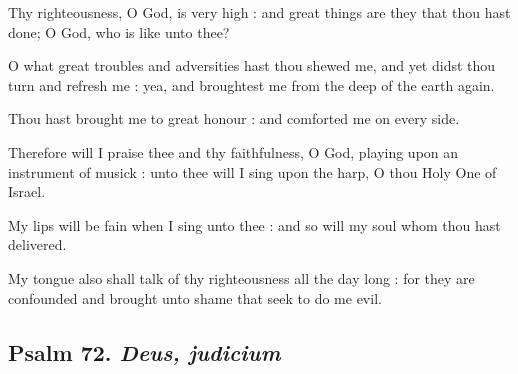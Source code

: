 Thy righteousness, O God, is very high : and great things are they that thou hast done; O God, who is like unto thee?\par
{}O what great troubles and adversities hast thou shewed me, and yet didst thou turn and refresh me : yea, and broughtest me from the deep of the earth again.\par
{}Thou hast brought me to great honour : and comforted me on every side.\par
{}Therefore will I praise thee and thy faithfulness, O God, playing upon an instrument of musick : unto thee will I sing upon the harp, O thou Holy One of Israel.\par
{}My lips will be fain when I sing unto thee : and so will my soul whom thou hast delivered.\par
{}My tongue also shall talk of thy righteousness all the day long : for they are confounded and brought unto shame that seek to do me evil.\par

\subsection{Psalm 72. \textit{Deus, judicium}}


